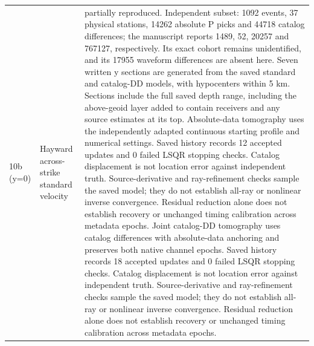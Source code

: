 \begin{longtable}{>{\raggedright\arraybackslash}p{}>{\raggedright\arraybackslash}p{}>{\raggedright\arraybackslash}p{}}
10b (y=0) & Hayward across-strike standard velocity & partially reproduced. Independent subset: 1092 events, 37 physical stations, 14262 absolute P picks and 44718 catalog differences; the manuscript reports 1489, 52, 20257 and 767127, respectively. Its exact cohort remains unidentified, and its 17955 waveform differences are absent here. Seven written y sections are generated from the saved standard and catalog-DD models, with hypocenters within 5 km. Sections include the full saved depth range, including the above-geoid layer added to contain receivers and any source estimates at its top. Absolute-data tomography uses the independently adapted continuous starting profile and numerical settings. Saved history records 12 accepted updates and 0 failed LSQR stopping checks. Catalog displacement is not location error against independent truth. Source-derivative and ray-refinement checks sample the saved model; they do not establish all-ray or nonlinear inverse convergence. Residual reduction alone does not establish recovery or unchanged timing calibration across metadata epochs. Joint catalog-DD tomography uses catalog differences with absolute-data anchoring and preserves both native channel epochs. Saved history records 18 accepted updates and 0 failed LSQR stopping checks. Catalog displacement is not location error against independent truth. Source-derivative and ray-refinement checks sample the saved model; they do not establish all-ray or nonlinear inverse convergence. Residual reduction alone does not establish recovery or unchanged timing calibration across metadata epochs.\\

\end{longtable}
